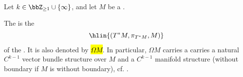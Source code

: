\begin{definition} \label{definition:cotangent_bundle_of_a_C_k_manifold}
Let $k \in \bbZ_{\geq 1} \cup \{\infty\}$, and let $M$ be a .

The  is the  
$$\hlin{(T^*M, \pi_{T^*M}, M)}$$
of the . It is also denoted by \hl{$\Omega M$}. In particular, $\Omega M$ carries a carries a natural $C^{k-1}$ vector  bundle structure over $M$ and  a $C^{k-1}$ manifold structure (without boundary if $M$ is without boundary), cf. .


\end{definition}

